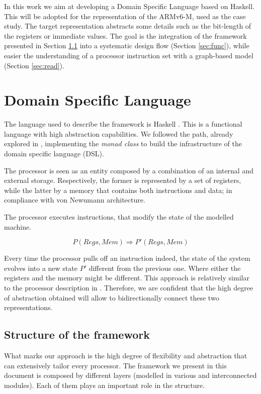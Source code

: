 \documentclass[conference]{IEEEtran}
\begin{document}
In this work we aim at developing a Domain Specific Language based on Haskell. This will be
adopted for the representation of the ARMv6-M, used as the case study. The target
representation abstracts some details such as the bit-length of the registers or immediate
values. The goal is the integration of the framework presented in Section \ref{sec:struct}
into a systematic design flow (Section \ref{sec:func}), while easier the understanding of
a processor instruction set with a graph-based model (Section \ref{sec:read}).


\section{Domain Specific Language}
\label{sec:dsl}
The language used to describe the framework is Haskell \cite{haskell}. This is a 
functional language with high abstraction capabilities.
We followed the path, already explored in \cite{armv7}, implementing the \textit{monad class}
to build the infrastructure of the domain specific language (DSL).

The processor is seen as an entity composed by a combination of an internal and
external storage. Respectively, the former is represented by a set of registers,
while the latter by a memory that contains both instructions and data; in compliance with von
Newumann architecture. 

The processor executes instructions, that modify the state of the modelled machine.

$$P(Regs, Mem) \Rightarrow P'(Regs, Mem)$$

\noindent Every time the processor pulls off an instruction indeed, the state of the system
evolves into a new state $P'$ different from the previous one. Where either the registers and
the memory might be different. This approach is relatively similar to the processor
description in \cite{isaFunc}. Therefore, we are confident that the high degree of
abstraction obtained will allow to bidirectionally connect these two representations.

\subsection{Structure of the framework}
\label{sec:struct}
What marks our approach is the high degree of flexibility and abstraction that can
extensively tailor every processor. The framework we present in this document is composed
by different layers (modelled in various and interconnected modules). Each of them plays 
an important role in the structure.
\end{document}
